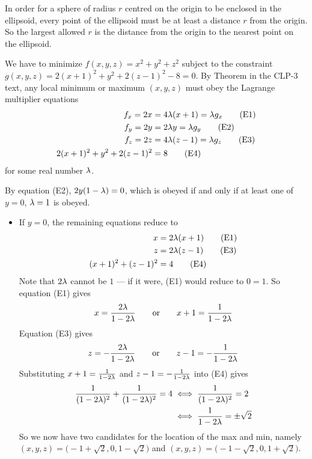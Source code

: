 \begin{solution}
 In order for a sphere of radius $r$ centred on the origin 
to be enclosed in the ellipsoid, every point of the ellipsoid must 
be at least a distance $r$ from the origin. So the largest 
allowed $r$ is the distance from the origin to the nearest point 
on the ellipsoid. 

We have to minimize $f(x,y,z)=x^2+y^2+z^2$ subject to the constraint 
$g(x,y,z) = 2(x+1)^2 + y^2 + 2(z-1)^2 -8=0$.
By Theorem  in the CLP-3 text, any local minimum
or maximum $(x,y,z)$ must obey the  Lagrange multiplier equations
\begin{align*}
f_x = 2x &=4 \lambda (x+1) = \lambda g_x \tag{E1} \\ 
f_y = 2y &=2 \lambda y = \lambda g_y \tag{E2} \\ 
f_z = 2z &=4 \lambda (z-1) = \lambda g_z \tag{E3} \\ 
2(x+1)^2 + y^2 + 2(z-1)^2 &= 8 \tag{E4}
\end{align*}
for some real number $\lambda$.

By equation (E2), $2y(1-\lambda)=0$, which is
obeyed if and only if at least one of $y=0$, $\lambda=1$ is obeyed.
\begin{itemize}
\item 
If $y=0$, the remaining equations reduce to
\begin{align*}
x &=2 \lambda (x+1)  \tag{E1} \\ 
z &=2 \lambda (z-1) \tag{E3} \\ 
(x+1)^2 + (z-1)^2 &= 4 \tag{E4}
\end{align*}
Note that $2\lambda$ cannot be $1$ --- if it were, (E1) would reduce to $0=1$.
So equation (E1) gives
\begin{align*}
x = \frac{2\lambda}{1-2\lambda}\qquad\text{or}\qquad
x+1 = \frac{1}{1-2\lambda}
\end{align*}
Equation (E3) gives
\begin{align*}
z = -\frac{2\lambda}{1-2\lambda}\qquad\text{or}\qquad
z-1 = -\frac{1}{1-2\lambda}
\end{align*}
Substituting $x+1 = \frac{1}{1-2\lambda}$ and $z-1 = -\frac{1}{1-2\lambda}$ into (E4)
gives
\begin{align*}
\frac{1}{(1-2\lambda)^2} +  \frac{1}{(1-2\lambda)^2} =4
&\iff \frac{1}{(1-2\lambda)^2} = 2 \\
&\iff \frac{1}{1-2\lambda} =\pm\sqrt{2}
\end{align*}
So we now have two candidates for the location of the max and min,
namely 
$(x,y,z) = \big(-1 + \sqrt{2}, 0, 1-\sqrt{2}\big)$ and 
$(x,y,z) = \big(-1 - \sqrt{2}, 0, 1+\sqrt{2}\big)$.


\end{itemize}
\end{solution}
